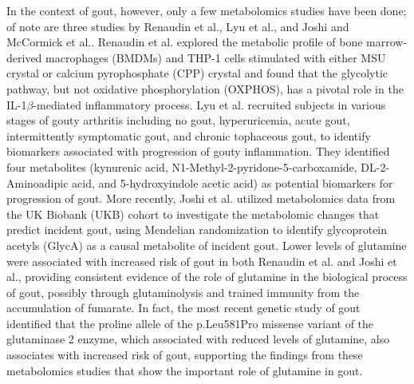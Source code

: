 \documentclass[a4paper,10pt]{article}
\begin{document}
In the context of gout, however, only a few metabolomics studies have been done; of note are three studies by Renaudin et al.\citep{renaudin_gout_2020}, Lyu et al.\citep{lyu_metabolomics_2022}, and Joshi and McCormick et al.\citep{joshi_prediagnostic_2023}.
Renaudin et al.\citep{renaudin_gout_2020} explored the metabolic profile of bone marrow-derived macrophages (BMDMs) and THP-1 cells stimulated with either MSU crystal or calcium pyrophosphate (CPP) crystal and found that the glycolytic pathway, but not oxidative phosphorylation (OXPHOS), has a pivotal role in the IL-1$\beta$-mediated inflammatory process.
Lyu et al.\citep{lyu_metabolomics_2022} recruited subjects in various stages of gouty arthritis including no gout, hyperuricemia, acute gout, intermittently symptomatic gout, and chronic tophaceous gout, to identify biomarkers associated with progression of gouty inflammation.
They identified four metabolites (kynurenic acid, N1-Methyl-2-pyridone-5-carboxamide, DL-2-Aminoadipic acid, and 5-hydroxyindole acetic acid) as potential biomarkers for progression of gout.
More recently, Joshi et al.\citep{joshi_prediagnostic_2023} utilized metabolomics data from the UK Biobank (UKB) cohort to investigate the metabolomic changes that predict incident gout, using Mendelian randomization to identify glycoprotein acetyls (GlycA) as a causal metabolite of incident gout.
Lower levels of glutamine were associated with increased risk of gout in both Renaudin et al.\citep{renaudin_gout_2020} and Joshi et al.\citep{joshi_prediagnostic_2023}, providing consistent evidence of the role of glutamine in the biological process of gout, possibly through glutaminolysis and trained immunity from the accumulation of fumarate\citep{arts_glutaminolysis_2016}.
In fact, the most recent genetic study of gout\citep{major_genome-wide_2024} identified that the proline allele of the p.Leu581Pro missense variant of the glutaminase 2 enzyme, which associated with reduced levels of glutamine, also associates with increased risk of gout, supporting the findings from these metabolomics studies that show the important role of glutamine in gout.
\\
\end{document}
